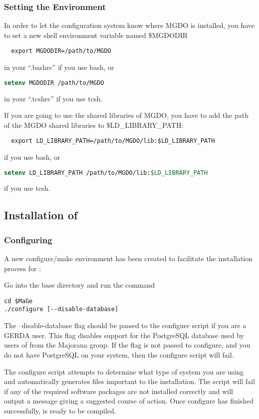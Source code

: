 \subsubsection{Setting the Environment}
In order to let the \mage configuration system know where MGDO is
installed, you have to set a new shell environment variable named
\$MGDODIR 
\begin{lstlisting}
  export MGDODIR=/path/to/MGDO
\end{lstlisting}
in your ``.bashrc'' if you use bash, or
\begin{lstlisting}[language=csh]
  setenv MGDODIR /path/to/MGDO
\end{lstlisting}
in your ``.tcshrc'' if you use tcsh.

If you are going to use the shared libraries of MGDO, you have to add
the path of the MGDO shared libraries to \$LD\_LIBRARY\_PATH:
\begin{lstlisting}
  export LD_LIBRARY_PATH=/path/to/MGDO/lib:$LD_LIBRARY_PATH
\end{lstlisting}
if you use bash, or 
\begin{lstlisting}[language=csh]
  setenv LD_LIBRARY_PATH /path/to/MGDO/lib:$LD_LIBRARY_PATH
\end{lstlisting}
if you use tcsh.

\subsection{Installation of \mage}
\subsubsection{Configuring}
A new configure/make environment has been created to facilitate the installation process for \mage:

Go into the \mage base directory and run the command
\begin{lstlisting}
cd $MaGe
./configure [--disable-database]
\end{lstlisting}

The --disable-database flag should be passed to the configure script
if you are a GERDA user.  This flag disables support for the
PostgreSQL database used by users of \mage from the Majorana group. If the flag is
not passed to configure, and you do not have PostgreSQL on your
system, then the configure script will fail.

The configure script attempts to determine what type of system you are
using and automatically generates files important to the installation.
The script will fail if any of the required software packages are not
installed correctly and will output a message giving a suggested
course of action.  Once configure has finished successfully, \mage is
ready to be compiled.

